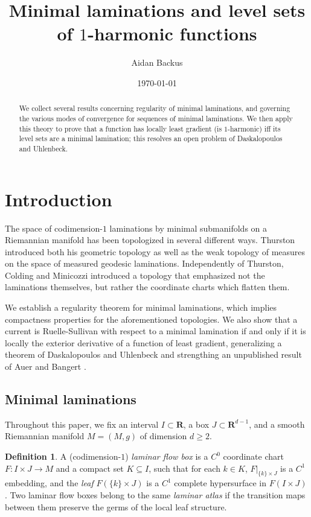 \documentclass[reqno,11pt]{amsart}
\title{Minimal laminations and level sets of $1$-harmonic functions}
\author{Aidan Backus}
\date{\today}
\newcommand{\RR}{\mathbf{R}}
\newcommand{\dfn}[1]{\emph{#1}\index{#1}}
\theoremstyle{definition}
\newtheorem{definition}[theorem]{Definition}
\numberwithin{equation}{section}
\begin{document}
\begin{abstract}
We collect several results concerning regularity of minimal laminations, and governing the various modes of convergence for sequences of minimal laminations.
We then apply this theory to prove that a function has locally least gradient (is $1$-harmonic) iff its level sets are a minimal lamination; this resolves an open problem of Daskalopoulos and Uhlenbeck.
\end{abstract}

\maketitle



\section{Introduction}
The space of codimension-$1$ laminations by minimal submanifolds on a Riemannian manifold has been topologized in several different ways.
Thurston \cite[Chapter 8]{thurston1979geometry} introduced both his geometric topology as well as the weak topology of measures on the space of measured geodesic laminations.
Independently of Thurston, Colding and Minicozzi \cite[Appendix B]{ColdingMinicozziIV} introduced a topology that emphasized not the laminations themselves, but rather the coordinate charts which flatten them.

We establish a regularity theorem for minimal laminations, which implies compactness properties for the aforementioned topologies.
We also show that a current is Ruelle-Sullivan with respect to a minimal lamination if and only if it is locally the exterior derivative of a function of least gradient, generalizing a theorem of Daskalopoulos and Uhlenbeck \cite[Theorem 6.1]{daskalopoulos2020transverse} and strengthing an unpublished result of Auer and Bangert \cite{Auer01, Auer12}.

\subsection{Minimal laminations}\label{Lams sections}
Throughout this paper, we fix an interval $I \subset \RR$, a box $J \subset \RR^{d - 1}$, and a smooth Riemannian manifold $M = (M, g)$ of dimension $d \geq 2$.

\begin{definition}
A (codimension-$1$) \dfn{laminar flow box} is a $C^0$ coordinate chart $F: I \times J \to M$ and a compact set $K \subseteq I$, such that for each $k \in K$, $F|_{\{k\} \times J}$ is a $C^1$ embedding, and the \dfn{leaf} $F(\{k\} \times J)$ is a $C^1$ complete hypersurface in $F(I \times J)$.
Two laminar flow boxes belong to the same \dfn{laminar atlas} if the transition maps between them preserve the germs of the local leaf structure.
\end{definition}
\end{document}
